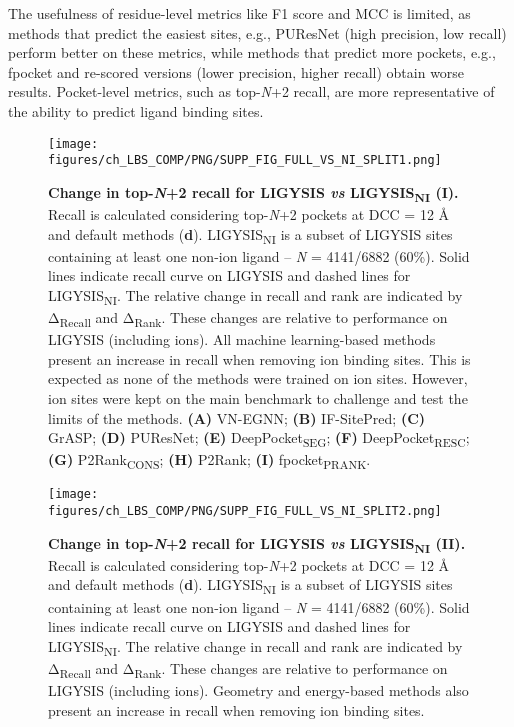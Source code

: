 The usefulness of residue-level metrics like F1 score and MCC is limited, as methods that predict the easiest sites, e.g., PUResNet (high precision, low recall) perform better on these metrics, while methods that predict more pockets, e.g., fpocket and re-scored versions (lower precision, higher recall) obtain worse results. Pocket-level metrics, such as top-\textit{N}+2 recall, are more representative of the ability to predict ligand binding sites.

\begin{figure}[htb!]
    \centering
    \texttt{[image: figures/ch\_LBS\_COMP/PNG/SUPP\_FIG\_FULL\_VS\_NI\_SPLIT1.png]}
    \caption[Change in top-\textit{N}+2 recall for LIGYSIS \textit{vs} LIGYSIS\textsubscript{NI} (I)]{\textbf{Change in top-\textit{N}+2 recall for LIGYSIS \textit{vs} LIGYSIS\textsubscript{NI} (I).} Recall is calculated considering top-\textit{N}+2 pockets at DCC = 12 \AA{} and default methods (\textbf{d}). LIGYSIS\textsubscript{NI} is a subset of LIGYSIS sites containing at least one non-ion ligand -- \textit{N} = 4141/6882 (60\%). Solid lines indicate recall curve on LIGYSIS and dashed lines for LIGYSIS\textsubscript{NI}. The relative change in recall and rank are indicated by Δ\textsubscript{Recall} and Δ\textsubscript{Rank}. These changes are relative to performance on LIGYSIS (including ions). All machine learning-based methods present an increase in recall when removing ion binding sites. This is expected as none of the methods were trained on ion sites. However, ion sites were kept on the main benchmark to challenge and test the limits of the methods. \textbf{(A)} VN-EGNN; \textbf{(B)} IF-SitePred; \textbf{(C)} GrASP; \textbf{(D)} PUResNet; \textbf{(E)} DeepPocket\textsubscript{SEG}; \textbf{(F)} DeepPocket\textsubscript{RESC}; \textbf{(G)} P2Rank\textsubscript{CONS}; \textbf{(H)} P2Rank; \textbf{(I)} fpocket\textsubscript{PRANK}.}
    \label{fig:LIGYSIS_VS_LIGYSISNI_1}
\end{figure}

\begin{figure}[htb!]
    \centering
    \texttt{[image: figures/ch\_LBS\_COMP/PNG/SUPP\_FIG\_FULL\_VS\_NI\_SPLIT2.png]}
   \caption[Change in top-\textit{N}+2 recall for LIGYSIS \textit{vs} LIGYSIS\textsubscript{NI} (II)]{\textbf{Change in top-\textit{N}+2 recall for LIGYSIS \textit{vs} LIGYSIS\textsubscript{NI} (II).} Recall is calculated considering top-\textit{N}+2 pockets at DCC = 12 \AA{} and default methods (\textbf{d}). LIGYSIS\textsubscript{NI} is a subset of LIGYSIS sites containing at least one non-ion ligand -- \textit{N} = 4141/6882 (60\%). Solid lines indicate recall curve on LIGYSIS and dashed lines for LIGYSIS\textsubscript{NI}. The relative change in recall and rank are indicated by Δ\textsubscript{Recall} and Δ\textsubscript{Rank}. These changes are relative to performance on LIGYSIS (including ions). Geometry and energy-based methods also present an increase in recall when removing ion binding sites.}
    \label{fig:LIGYSIS_VS_LIGYSISNI_2}
\end{figure}

